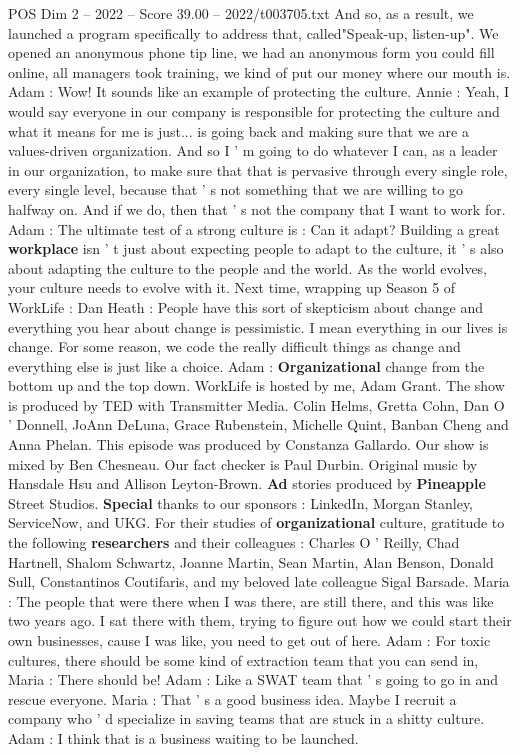 \begin{textsample}{POS Dim 2 – 2022 – Score 39.00 – 2022/t003705.txt}
And so, as a result, we launched a program specifically to address that, called"Speak-up, listen-up".
We opened an anonymous phone tip line, we had an anonymous form you could fill online, all managers took training, we kind of put our money where our mouth is.
Adam : Wow!
It sounds like an example of protecting the culture.
Annie : Yeah, I would say everyone in our company is responsible for protecting the culture and what it means for me is just... is going back and making sure that we are a values-driven organization.
And so I ' m going to do whatever I can, as a leader in our organization, to make sure that that is pervasive through every single role, every single level, because that ' s not something that we are willing to go halfway on.
And if we do, then that ' s not the company that I want to work for.
Adam : The ultimate test of a strong culture is : Can it adapt?
Building a great \textbf{workplace} isn ' t just about expecting people to adapt to the culture, it ' s also about adapting the culture to the people and the world.
As the world evolves, your culture needs to evolve with it.
Next time, wrapping up Season 5 of WorkLife : Dan Heath : People have this sort of skepticism about change and everything you hear about change is pessimistic.
I mean everything in our lives is change.
For some reason, we code the really difficult things as change and everything else is just like a choice.
Adam : \textbf{Organizational} change from the bottom up and the top down.
WorkLife is hosted by me, Adam Grant.
The show is produced by TED with Transmitter Media.
Colin Helms, Gretta Cohn, Dan O ' Donnell, JoAnn DeLuna, Grace Rubenstein, Michelle Quint, Banban Cheng and Anna Phelan.
This episode was produced by Constanza Gallardo.
Our show is mixed by Ben Chesneau.
Our fact checker is Paul Durbin.
Original music by Hansdale Hsu and Allison Leyton-Brown. \textbf{Ad} stories produced by \textbf{Pineapple} Street Studios. \textbf{Special} thanks to our sponsors : LinkedIn, Morgan Stanley, ServiceNow, and UKG.
For their studies of \textbf{organizational} culture, gratitude to the following \textbf{researchers} and their colleagues : Charles O ' Reilly, Chad Hartnell, Shalom Schwartz, Joanne Martin, Sean Martin, Alan Benson, Donald Sull, Constantinos Coutifaris, and my beloved late colleague Sigal Barsade.
Maria : The people that were there when I was there, are still there, and this was like two years ago.
I sat there with them, trying to figure out how we could start their own businesses, cause I was like, you need to get out of here.
Adam : For toxic cultures, there should be some kind of extraction team that you can send in, Maria : There should be!
Adam : Like a SWAT team that ' s going to go in and rescue everyone.
Maria : That ' s a good business idea.
Maybe I recruit a company who ' d specialize in saving teams that are stuck in a shitty culture.
Adam : I think that is a business waiting to be launched.

\end{textsample}
